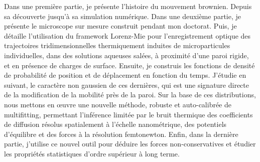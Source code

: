 Dans une première partie, je présente l'histoire du mouvement brownien.  Depuis sa découverte jusqu'à sa simulation numérique. Dans une deuxième partie, je présente le microscope sur mesure construit pendant mon doctorat.  Puis, je détaille l'utilisation du framework Lorenz-Mie pour l'enregistrement optique des trajectoires tridimensionnelles thermiquement induites de microparticules individuelles, dans des solutions aqueuses salées, à proximité d'une paroi rigide, et en présence de charges de surface. Ensuite, je construis les fonctions de densité de probabilité de position et de déplacement en fonction du temps. J'étudie en suivant, le caractère non gaussien de ces dernières, qui est une signature directe de la modification de la mobilité près de la paroi.  Sur la base de ces distributions, nous mettons en œuvre une nouvelle méthode, robuste et auto-calibrée de multifitting, permettant l'inférence limitée par le bruit thermique des coefficients de diffusion résolus spatialement à l'échelle nanométrique, des potentiels d'équilibre et des forces à la résolution femtonewton. Enfin, dans la dernière partie, j'utilise ce nouvel outil pour déduire les forces non-conservatives et étudier les propriétés statistiques d'ordre supérieur à long terme.




